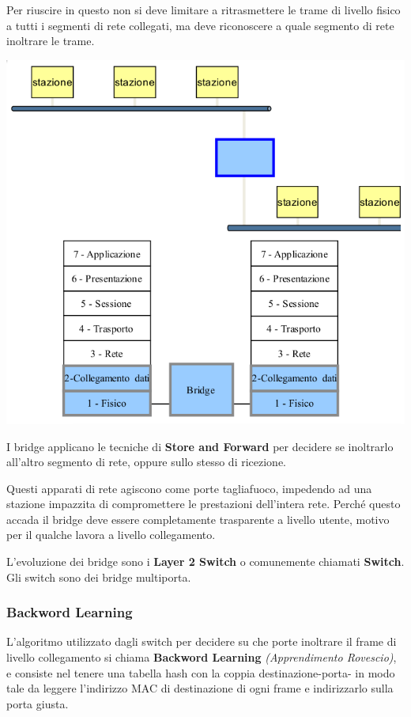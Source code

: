 \documentclass[12pt]{article}
\begin{document}
Per riuscire in questo non si deve limitare a ritrasmettere le trame di livello fisico a tutti i segmenti di rete collegati, 
ma deve riconoscere a quale segmento di rete inoltrare le trame.
\begin{center}
	\includegraphics[scale=0.35]{livello_collegamento-img14.png}
\end{center}
I bridge applicano le tecniche di \textbf{Store and Forward} per decidere se inoltrarlo all'altro segmento di rete, oppure 
sullo stesso di ricezione.

Questi apparati di rete agiscono come porte tagliafuoco, impedendo ad una stazione impazzita di compromettere le 
prestazioni dell'intera rete. Perch\'e questo accada il bridge deve essere completamente trasparente a livello utente, motivo 
per il qualche lavora a livello collegamento.

L'evoluzione dei bridge sono i \textbf{Layer 2 Switch} o comunemente chiamati \textbf{Switch}. Gli switch sono dei bridge
multiporta.

\subsubsection{Backword Learning} \label{ieee-802-backward-learning}
L'algoritmo utilizzato dagli switch per decidere su che porte inoltrare il frame di livello collegamento si chiama 
\textbf{Backword Learning} \textit{(Apprendimento Rovescio)}, e consiste nel tenere una tabella hash con la coppia 
destinazione-porta- in modo tale da leggere l'indirizzo MAC di destinazione di ogni frame e indirizzarlo sulla porta giusta.
\end{document}
